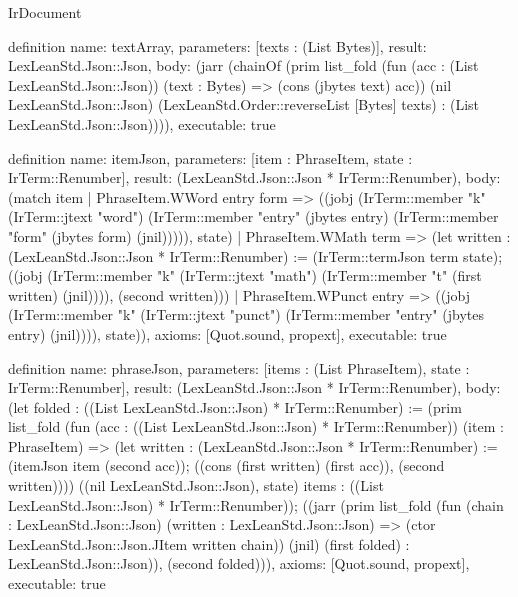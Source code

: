 \begin{lexlean}{IrDocument}
\begin{semanticmodule}
definition{
  name: textArray,
  parameters: [texts : (List Bytes)],
  result: LexLeanStd.Json::Json,
  body: (jarr (chainOf (prim list_fold (fun (acc : (List LexLeanStd.Json::Json)) (text : Bytes) => (cons (jbytes text) acc)) (nil LexLeanStd.Json::Json) (LexLeanStd.Order::reverseList [Bytes] texts) : (List LexLeanStd.Json::Json)))),
  executable: true
}

definition{
  name: itemJson,
  parameters: [item : PhraseItem, state : IrTerm::Renumber],
  result: (LexLeanStd.Json::Json * IrTerm::Renumber),
  body: (match item
    | PhraseItem.WWord entry form => ((jobj (IrTerm::member "k" (IrTerm::jtext "word") (IrTerm::member "entry" (jbytes entry) (IrTerm::member "form" (jbytes form) (jnil))))), state)
    | PhraseItem.WMath term => (let written : (LexLeanStd.Json::Json * IrTerm::Renumber) := (IrTerm::termJson term state); ((jobj (IrTerm::member "k" (IrTerm::jtext "math") (IrTerm::member "t" (first written) (jnil)))), (second written)))
    | PhraseItem.WPunct entry => ((jobj (IrTerm::member "k" (IrTerm::jtext "punct") (IrTerm::member "entry" (jbytes entry) (jnil)))), state)),
  axioms: [Quot.sound, propext],
  executable: true
}

definition{
  name: phraseJson,
  parameters: [items : (List PhraseItem), state : IrTerm::Renumber],
  result: (LexLeanStd.Json::Json * IrTerm::Renumber),
  body: (let folded : ((List LexLeanStd.Json::Json) * IrTerm::Renumber) := (prim list_fold (fun (acc : ((List LexLeanStd.Json::Json) * IrTerm::Renumber)) (item : PhraseItem) => (let written : (LexLeanStd.Json::Json * IrTerm::Renumber) := (itemJson item (second acc)); ((cons (first written) (first acc)), (second written)))) ((nil LexLeanStd.Json::Json), state) items : ((List LexLeanStd.Json::Json) * IrTerm::Renumber)); ((jarr (prim list_fold (fun (chain : LexLeanStd.Json::Json) (written : LexLeanStd.Json::Json) => (ctor LexLeanStd.Json::Json.JItem written chain)) (jnil) (first folded) : LexLeanStd.Json::Json)), (second folded))),
  axioms: [Quot.sound, propext],
  executable: true
}


\end{semanticmodule}
\end{lexlean}
